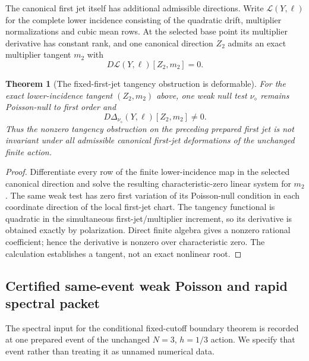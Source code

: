 \documentclass[11pt]{article}
\newtheorem{theorem}{Theorem}[section]
\numberwithin{equation}{section}
\theoremstyle{definition}
\theoremstyle{remark}
\begin{document}
The canonical first jet itself has additional admissible directions.  Write
$\mathcal L(Y,\ell)$ for the complete lower incidence consisting of the
quadratic drift, multiplier normalizations and cubic mean rows.  At the
selected base point its multiplier derivative has constant rank, and one
canonical direction $Z_2$ admits an exact multiplier tangent $m_2$ with
\begin{equation}
 D\mathcal L(Y,\ell)[Z_2,m_2]=0.
 \label{eq:supp-exact-lower-tangent}
\end{equation}

\begin{theorem}[The fixed-first-jet tangency obstruction is deformable]
\label{thm:supp-exact-upstream-deformation}
For the exact lower-incidence tangent $(Z_2,m_2)$ above, one weak null test
$\nu_\diamond$ remains Poisson-null to first order and
\begin{equation}
 D\Delta_{\nu_\diamond}(Y,\ell)[Z_2,m_2]\ne0.
 \label{eq:supp-exact-upstream-nonzero}
\end{equation}
Thus the nonzero tangency obstruction on the preceding prepared first jet is
not invariant under all admissible canonical first-jet deformations of the
unchanged finite action.
\end{theorem}
\begin{proof}
Differentiate every row of the finite lower-incidence map in the selected
canonical direction and solve the resulting characteristic-zero linear system
for $m_2$.  The same weak test has zero first variation of its Poisson-null
condition in each coordinate direction of the local first-jet chart.  The
tangency functional is quadratic in the simultaneous first-jet/multiplier
increment, so its derivative is obtained exactly by polarization.  Direct
finite algebra gives a nonzero rational coefficient; hence the derivative is
nonzero over characteristic zero.  The calculation establishes a tangent,
not an exact nonlinear root.
\end{proof}


\subsection{Certified same-event weak Poisson and rapid spectral packet}
\label{subsec:supp-exact-certified-rapid}

The spectral input for the conditional fixed-cutoff boundary theorem is
recorded at one prepared event of the unchanged $N=3$, $h=1/3$ action.
We specify that event rather than treating it as unnamed numerical data.
\end{document}
